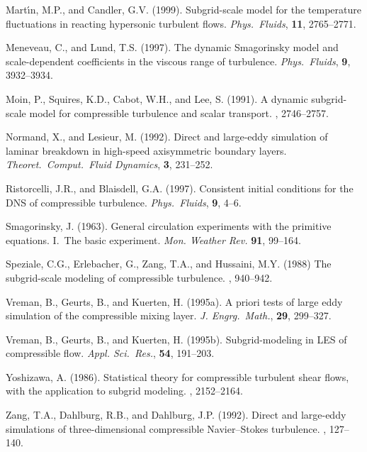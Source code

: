 \documentclass[tcfd]{svjour}
\begin{document}
\begin{thebibliography}{}
 Mart\'{\i}n, M.P., and Candler, G.V. (1999). Subgrid-scale model for the temperature
f\/luctuations in reacting hypersonic turbulent f\/lows. {\it Phys.\ Fluids}, {\bf 11},
2765--2771.

 Meneveau, C., and Lund, T.S. (1997). The dynamic Smagorinsky model and
scale-dependent coeff\/icients in the viscous range of turbulence. {\it Phys.\ Fluids}, {\bf 9},
3932--3934.

 Moin, P., Squires, K.D., Cabot, W.H., and Lee, S. (1991). A dynamic subgrid-scale
model for compressible turbulence and scalar transport. , 2746--2757.

 Normand, X., and Lesieur, M. (1992). Direct and large-eddy simulation of laminar
breakdown in high-speed axisymmetric boundary layers. {\it Theoret.\ Comput.\ Fluid Dynamics},
{\bf 3}, 231--252.

 Ristorcelli, J.R., and Blaisdell, G.A. (1997). Consistent initial conditions for the
DNS of compressible turbulence. {\it Phys.~Fluids}, {\bf 9}, 4--6.

 Smagorinsky, J. (1963). General circulation experiments with the primitive equations.
I.~The basic experiment. {\it Mon. Weather Rev.} {\bf 91}, 99--164.

 Speziale, C.G., Erlebacher, G., Zang, T.A., and Hussaini, M.Y. (1988) The
subgrid-scale modeling of compressible turbulence. , 940--942.

 Vreman, B., Geurts, B., and Kuerten, H. (1995a). A priori tests of large eddy
simulation of the compressible mixing layer. {\it J. Engrg.\ Math.}, {\bf 29}, 299--327.

 Vreman, B., Geurts, B., and Kuerten, H. (1995b). Subgrid-modeling in LES of
compressible f\/low. {\it Appl. Sci.\ Res.}, {\bf 54}, 191--203.

 Yoshizawa, A. (1986). Statistical theory for compressible turbulent shear f\/lows, with
the application to subgrid modeling. , 2152--2164.

 Zang, T.A., Dahlburg, R.B., and Dahlburg, J.P. (1992). Direct and large-eddy
simulations of three-dimensional compressible Navier--Stokes turbulence. , 127--140.

\end{thebibliography}
\end{document}
